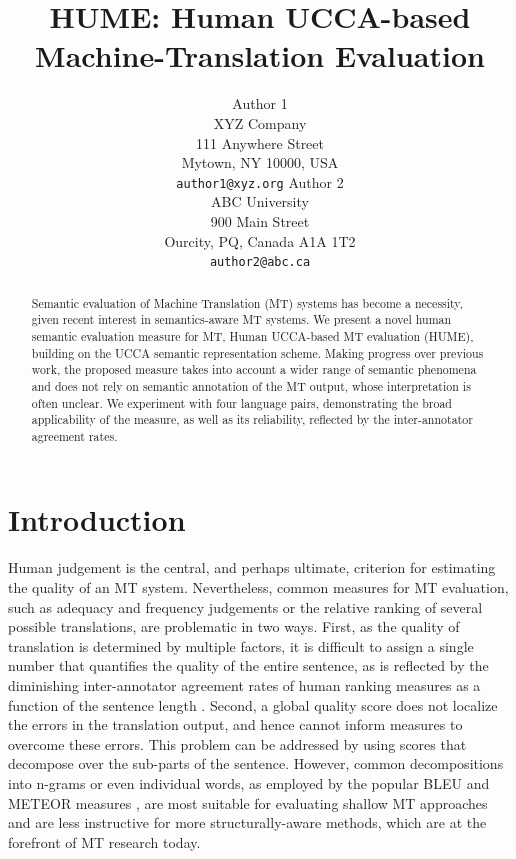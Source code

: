 \documentclass[11pt]{article}
\title{HUME: Human UCCA-based Machine-Translation Evaluation}
\author{Author 1\\
	    XYZ Company\\
	    111 Anywhere Street\\
	    Mytown, NY 10000, USA\\
	    {\tt author1@xyz.org}
	  \And
	Author 2\\
  	ABC University\\
  	900 Main Street\\
  	Ourcity, PQ, Canada A1A 1T2\\
  {\tt author2@abc.ca}}
\date{}
\begin{document}
\maketitle

\begin{abstract}

  Semantic evaluation of Machine Translation (MT) systems has become
  a necessity, given recent interest in semantics-aware MT systems.
  We present a novel human semantic evaluation measure for MT, Human
  UCCA-based MT evaluation (HUME), building on the UCCA semantic representation scheme.
  Making progress over previous work, the proposed measure takes into account
  a wider range of semantic phenomena and does not rely on semantic annotation
  of the MT output, whose interpretation is often unclear. 
  We experiment with four language pairs, demonstrating the broad applicability of
  the measure, as well as its reliability, reflected by the inter-annotator agreement
  rates.

\end{abstract}


\section{Introduction}\label{sec:intro}

Human judgement is the central, and perhaps ultimate, criterion for estimating the
quality of an MT system.
Nevertheless, common measures for MT evaluation, such as adequacy and frequency judgements
or the relative ranking of several possible translations, are problematic in two ways.
First, as the quality of translation is determined by multiple factors, it is difficult
to assign a single number that quantifies the quality of the entire sentence, as is reflected
by the diminishing inter-annotator agreement rates of human ranking measures
as a function of the sentence length \cite{Bojar:2011}.
Second, a global quality score does not localize the errors in the translation output,
and hence cannot inform measures to overcome these errors.
This problem can be addressed by using scores that decompose over
the sub-parts of the sentence. 
However, common decompositions into n-grams or even individual words, as employed by the
popular BLEU \cite{Papineni:2002} and METEOR measures \cite{Banerjee:2005},
are most suitable for evaluating shallow MT approaches and are
less instructive for more structurally-aware methods, which are at
the forefront of MT research today.
\end{document}
